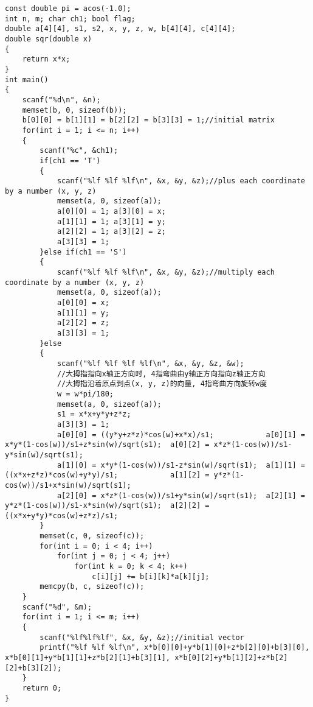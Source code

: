 \begin{lstlisting}
const double pi = acos(-1.0);
int n, m; char ch1; bool flag;
double a[4][4], s1, s2, x, y, z, w, b[4][4], c[4][4];
double sqr(double x)
{
	return x*x;
}
int main()
{
	scanf("%d\n", &n);
	memset(b, 0, sizeof(b));
	b[0][0] = b[1][1] = b[2][2] = b[3][3] = 1;//initial matrix
	for(int i = 1; i <= n; i++)
	{
		scanf("%c", &ch1);
		if(ch1 == 'T')
		{
			scanf("%lf %lf %lf\n", &x, &y, &z);//plus each coordinate by a number (x, y, z)
			memset(a, 0, sizeof(a));
			a[0][0] = 1; a[3][0] = x;
			a[1][1] = 1; a[3][1] = y;
			a[2][2] = 1; a[3][2] = z;
			a[3][3] = 1;
		}else if(ch1 == 'S')
		{
			scanf("%lf %lf %lf\n", &x, &y, &z);//multiply each coordinate by a number (x, y, z)
			memset(a, 0, sizeof(a));
			a[0][0] = x;
			a[1][1] = y;
			a[2][2] = z;
			a[3][3] = 1;
		}else
		{
			scanf("%lf %lf %lf %lf\n", &x, &y, &z, &w);
			//大拇指指向x轴正方向时, 4指弯曲由y轴正方向指向z轴正方向
			//大拇指沿着原点到点(x, y, z)的向量, 4指弯曲方向旋转w度
			w = w*pi/180;
			memset(a, 0, sizeof(a));
			s1 = x*x+y*y+z*z;
			a[3][3] = 1;
			a[0][0] = ((y*y+z*z)*cos(w)+x*x)/s1;			a[0][1] = x*y*(1-cos(w))/s1+z*sin(w)/sqrt(s1);	a[0][2] = x*z*(1-cos(w))/s1-y*sin(w)/sqrt(s1);
			a[1][0] = x*y*(1-cos(w))/s1-z*sin(w)/sqrt(s1);	a[1][1] = ((x*x+z*z)*cos(w)+y*y)/s1;			a[1][2] = y*z*(1-cos(w))/s1+x*sin(w)/sqrt(s1);
			a[2][0] = x*z*(1-cos(w))/s1+y*sin(w)/sqrt(s1);	a[2][1] = y*z*(1-cos(w))/s1-x*sin(w)/sqrt(s1);	a[2][2] = ((x*x+y*y)*cos(w)+z*z)/s1;
		}
		memset(c, 0, sizeof(c));
		for(int i = 0; i < 4; i++)
			for(int j = 0; j < 4; j++)
				for(int k = 0; k < 4; k++)
					c[i][j] += b[i][k]*a[k][j];
		memcpy(b, c, sizeof(c));
	}
	scanf("%d", &m);
	for(int i = 1; i <= m; i++)
	{
		scanf("%lf%lf%lf", &x, &y, &z);//initial vector
		printf("%lf %lf %lf\n", x*b[0][0]+y*b[1][0]+z*b[2][0]+b[3][0], x*b[0][1]+y*b[1][1]+z*b[2][1]+b[3][1], x*b[0][2]+y*b[1][2]+z*b[2][2]+b[3][2]);
	}
	return 0;
}
\end{lstlisting}
